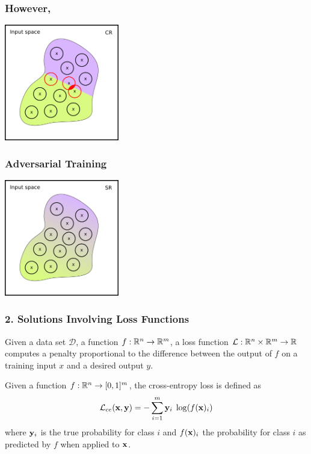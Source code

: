 \documentclass[aspectratio=169]{beamer}
\begin{document}
\begin{frame}[fragile]
  \frametitle{However,}



\begin{center}

  \includegraphics[width=5cm]{Images/SR-vs-CR-5.png}

  \end{center}
  
 \end{frame}

 \begin{frame}[fragile]
  \frametitle{Adversarial Training}



\begin{center}

  \includegraphics[width=5cm]{Images/SR-vs-CR-3.png}

  \end{center}
  
 \end{frame}


\begin{frame}
  \frametitle{2. Solutions Involving Loss Functions}
Given a data set $\mathcal{D} $,  a function  ${f: {\mathbb R}^n \rightarrow {\mathbb R}^m}$,
	a loss function $\mathcal{L}: {\mathbb R}^n \times {\mathbb R}^m \rightarrow {\mathbb R}$ computes a penalty proportional to the difference between the output of $f$ on a training input $x$ and a desired output $y$.\pause


\begin{example}
	\label{eq:cross-entropy}
	Given a function  ${f: {\mathbb R}^n \rightarrow [0,1]^m}$, the cross-entropy loss is defined as 
	\begin{equation}\label{eq:ce}
	\mathcal{L}_{ce}(\mathbf{x}, \mathbf{y}) = - \sum_{i=1}^{m} \mathbf{y}_i \; \log(f(\mathbf{x})_i)
	\end{equation}
	where $\mathbf{y}_i$ is the true probability for class $i$ and $f(\mathbf{x})_i$ the probability for class $i$ as predicted by $f$ when applied to $\mathbf{x}$.
\end{example}

\end{frame}
\end{document}
